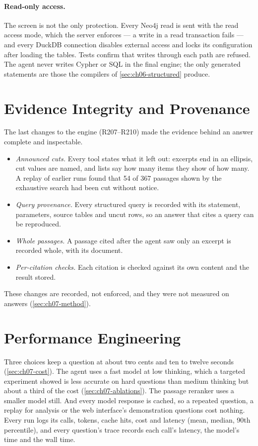 \paragraph{Read-only access.} The screen is not the only protection. Every Neo4j read is sent with the read access
mode, which the server enforces --- a write in a read transaction fails --- and every DuckDB connection disables
external access and locks its configuration after loading the tables. Tests confirm that writes through each path are
refused. The agent never writes Cypher or SQL in the final engine; the only generated statements are those the
compilers of \cref{sec:ch06-structured} produce.

\section{Evidence Integrity and Provenance}\label{sec:ch06-integrity}

The last changes to the engine (R207--R210) made the evidence behind an answer complete and inspectable.
\begin{itemize}[nosep]
\item \emph{Announced cuts.} Every tool states what it left out: excerpts end in an ellipsis, cut values are named,
and lists say how many items they show of how many. A replay of earlier runs found that 54 of 367 passages shown
by the exhaustive search had been cut without notice.
\item \emph{Query provenance.} Every structured query is recorded with its statement, parameters, source tables and
uncut rows, so an answer that cites a query can be reproduced.
\item \emph{Whole passages.} A passage cited after the agent saw only an excerpt is recorded whole, with its
document.
\item \emph{Per-citation checks.} Each citation is checked against its own content and the result stored.
\end{itemize}
These changes are recorded, not enforced, and they were not measured on answers (\cref{sec:ch07-method}).

\section{Performance Engineering}\label{sec:ch06-performance}

Three choices keep a question at about two cents and ten to twelve seconds (\cref{sec:ch07-cost}). The agent uses a
fast model at low thinking, which a targeted experiment showed is less accurate on hard questions than medium
thinking but about a third of the cost (\cref{sec:ch07-ablations}). The passage reranker uses a smaller model still.
And every model response is cached, so a repeated question, a replay for analysis or the web interface's
demonstration questions cost nothing. Every run logs its calls, tokens, cache hits, cost and latency (mean, median,
90th percentile), and every question's trace records each call's latency, the model's time and the wall time.
